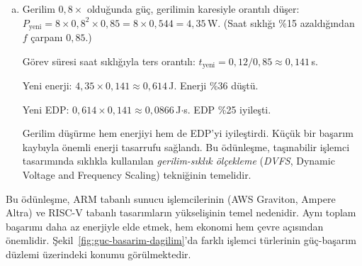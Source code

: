 \begin{ornek}[2.14]
\begin{enumerate}[(a)]
    \item Gerilim $0{,}8\times$ olduğunda güç, gerilimin karesiyle orantılı düşer: $P_{\text{yeni}} = 8 \times 0{,}8^2 \times 0{,}85 = 8 \times 0{,}544 = 4{,}35$\,W. (Saat sıklığı \%15 azaldığından $f$ çarpanı $0{,}85$.)

    Görev süresi saat sıklığıyla ters orantılı: $t_{\text{yeni}} = 0{,}12 / 0{,}85 \approx 0{,}141$\,s.

    Yeni enerji: $4{,}35 \times 0{,}141 \approx 0{,}614$\,J. Enerji \%36 düştü.

    Yeni EDP: $0{,}614 \times 0{,}141 \approx 0{,}0866$\,J$\cdot$s. EDP \%25 iyileşti.

    Gerilim düşürme hem enerjiyi hem de EDP'yi iyileştirdi. Küçük bir başarım kaybıyla önemli enerji tasarrufu sağlandı. Bu ödünleşme, taşınabilir işlemci tasarımında sıklıkla kullanılan \emph{gerilim-sıklık ölçekleme} (\emph{DVFS}, Dynamic Voltage and Frequency Scaling) tekniğinin temelidir.
\end{enumerate}
\end{ornek}

Bu ödünleşme, ARM tabanlı sunucu işlemcilerinin (AWS Graviton, Ampere Altra) ve RISC-V tabanlı tasarımların yükselişinin temel nedenidir. Aynı toplam başarımı daha az enerjiyle elde etmek, hem ekonomi hem çevre açısından önemlidir. Şekil~\ref{fig:guc-basarim-dagilim}'da farklı işlemci türlerinin güç-başarım düzlemi üzerindeki konumu görülmektedir.


